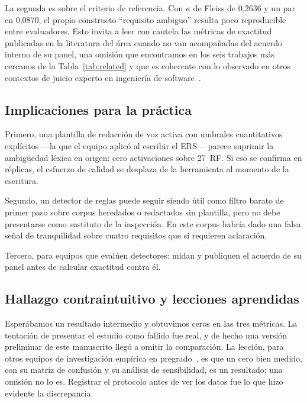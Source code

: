 \documentclass[runningheads]{llncs}
\begin{document}
La segunda es sobre el criterio de referencia. Con $\kappa$ de Fleiss de 0,2636
y un par en 0,0870, el propio constructo ``requisito ambiguo'' resulta poco
reproducible entre evaluadores. Esto invita a leer con cautela las métricas de
exactitud publicadas en la literatura del área cuando no van acompañadas del
acuerdo interno de su panel, una omisión que encontramos en los seis trabajos
más cercanos de la Tabla~\ref{tab:related} y que es coherente con lo observado
en otros contextos de juicio experto en ingeniería de
software~\cite{shepperd2014researcher,jorgensen2004}.

\subsection{Implicaciones para la práctica}

Primero, una plantilla de redacción de voz activa con umbrales cuantitativos
explícitos ---la que el equipo aplicó al escribir el ERS--- parece suprimir la
ambigüedad léxica en origen: cero activaciones sobre 27~RF. Si eso se confirma
en réplicas, el esfuerzo de calidad se desplaza de la herramienta al momento de
la escritura.

Segundo, un detector de reglas puede seguir siendo útil como filtro barato de
primer paso sobre corpus heredados o redactados sin plantilla, pero no debe
presentarse como sustituto de la inspección. En este corpus habría dado una
falsa señal de tranquilidad sobre cuatro requisitos que sí requieren
aclaración.

Tercero, para equipos que evalúen detectores: midan y publiquen el acuerdo de
su panel antes de calcular exactitud contra él.

\subsection{Hallazgo contraintuitivo y lecciones aprendidas}

Esperábamos un resultado intermedio y obtuvimos ceros en las tres métricas. La
tentación de presentar el estudio como fallido fue real, y de hecho una versión
preliminar de este manuscrito llegó a omitir la comparación. La lección, para
otros equipos de investigación empírica en pregrado~\cite{fernandez2018napire},
es que un cero bien medido, con su matriz de confusión y su análisis de
sensibilidad, es un resultado; una omisión no lo es. Registrar el protocolo
antes de ver los datos fue lo que hizo evidente la discrepancia.

\end{document}
